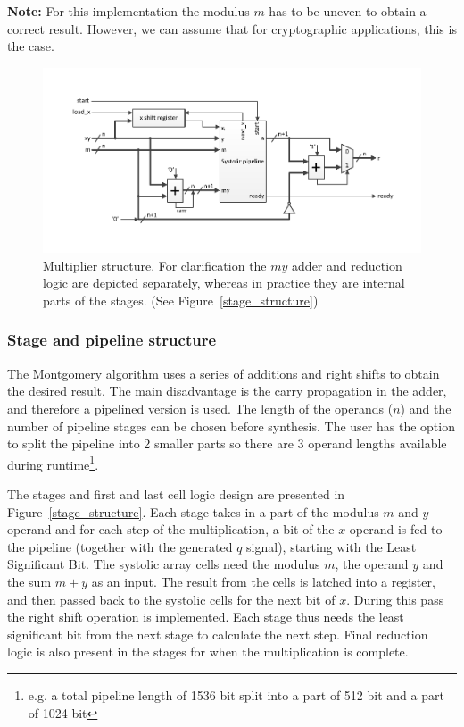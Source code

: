 \textbf{Note:} For this implementation the modulus $m$ has to be uneven to obtain a correct result. However, we can assume that for cryptographic applications, this is the case.


\begin{figure}[H] 
\centering 
\includegraphics[trim=1.2cm 1.2cm 1.2cm 1.2cm, width=15cm]{pictures/mult_structure.pdf}
\caption{Multiplier structure. For clarification the $my$ adder and reduction logic are depicted separately, whereas in practice they are internal parts of the stages. (See Figure~\ref{stage_structure})}
\label{mult_structure}
\end{figure}

\subsubsection{Stage and pipeline structure}
The Montgomery algorithm uses a series of additions and right shifts to obtain the desired result. The main disadvantage
is the carry propagation in the adder, and therefore a pipelined version is used. The length of the operands ($n$) and
the number of pipeline stages can be chosen before synthesis. The user has the option to split the pipeline into 2
smaller parts so there are 3 operand lengths available during runtime\footnote{e.g. a total pipeline length of 1536 bit
split into a part of 512 bit and a part of 1024 bit}.

The stages and first and last cell logic design are presented in Figure~\ref{stage_structure}. Each stage takes in a
part of the modulus $m$ and $y$ operand and for each step of the multiplication, a bit of the $x$ operand is fed to the
pipeline (together with the generated $q$ signal), starting with the Least Significant Bit. The systolic array cells
need the modulus $m$, the operand $y$ and the sum $m+y$ as an input. The result from the cells is latched into a
register, and then passed back to the systolic cells for the next bit of $x$. During this pass the right shift operation
is implemented. Each stage thus needs the least significant bit from the next stage to calculate the next step. Final
reduction logic is also present in the stages for when the multiplication is complete.

